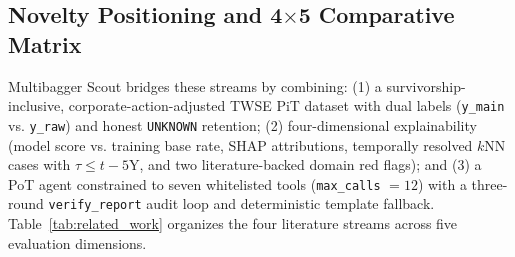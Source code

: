 \documentclass[conference]{IEEEtran}
\begin{document}
\subsection{Novelty Positioning and 4$\times$5 Comparative Matrix}
Multibagger Scout bridges these streams by combining: (1) a survivorship-inclusive, corporate-action-adjusted TWSE PiT dataset with dual labels (\texttt{y\_main} vs. \texttt{y\_raw}) and honest \texttt{UNKNOWN} retention; (2) four-dimensional explainability (model score vs. training base rate, SHAP attributions, temporally resolved $k$NN cases with $\tau \le t - 5\text{Y}$, and two literature-backed domain red flags); and (3) a PoT agent constrained to seven whitelisted tools (\texttt{max\_calls} $= 12$) with a three-round \texttt{verify\_report} audit loop and deterministic template fallback. Table~\ref{tab:related_work} organizes the four literature streams across five evaluation dimensions.
\end{document}
